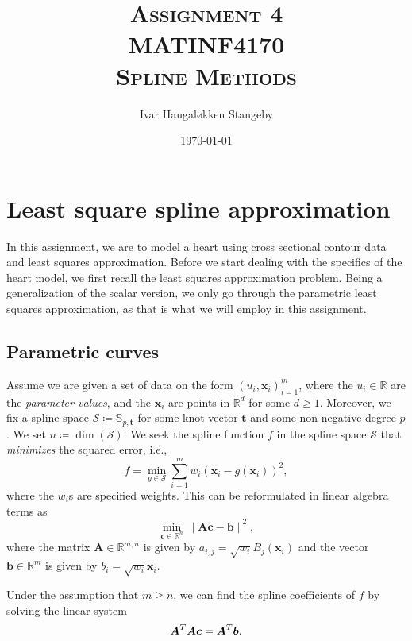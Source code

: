 \documentclass[article]{memoir}
\title{\textsc{Assignment 4 \\ 
               MATINF4170 \\
       Spline Methods}}
\author{Ivar Haugal{\o}kken Stangeby}
\date{\today}
\newcommand{\x}{\mathbf{x}}
\newcommand{\R}{\mathbb{R}}
\renewcommand{\t}{\mathbf{t}}
\renewcommand{\c}{\boldsymbol{c}}
\newcommand{\A}{\boldsymbol{A}}
\renewcommand{\b}{\boldsymbol{b}}
\renewcommand{\S}{\mathcal{S}}
\begin{document}
\maketitle

\tableofcontents*

\chapter{Least square spline approximation}

In this assignment, we are to model a heart using cross sectional contour data
and least squares approximation. Before we start dealing with the specifics of
the heart model, we first recall the least squares approximation problem.
Being a generalization of the scalar version, we only go through the parametric
least squares approximation, as that is what we will employ in this assignment.

\section{Parametric curves}
\label{sec:para_curves}
Assume we are given a set of data on the form \((u_i, \x_i)_{i = 1}^{m}\),
where the \( u_i \in \R \) are the \emph{parameter values}, and the \( \x_i \)
are points in \( \R^d \) for some \( d \geq 1 \). Moreover, we fix a spline
space \(\S \coloneqq \mathbb{S}_{p, \t}\) for some knot vector \(\t\) and some
non-negative degree \( p \).  We set \( n \coloneqq \dim(\S)\).  We seek the
spline function \( f \) in the spline space \(\S\) that \emph{minimizes} the
squared error, i.e., 
\begin{equation} 
    \label{eq:least_squares_problem}
    f = \min_{g \in \S} \sum^{m}_{i=1} w_i (\x_i - g(\x_i))^2,
\end{equation}
where the \(w_i\)s are specified weights. This can be reformulated in linear
algebra terms as
\begin{equation}
    \label{eq:least_quares_linalg}
    \min_{\c \in \R^n} \| \A\c - \b \|^2, 
\end{equation}
where the matrix \( \A \in \R^{m, n} \) is given by \( a_{i, j} =
\sqrt{w_i}B_j(\x_i) \) and the vector \( \b \in \R^m \) is given by \( b_i =
\sqrt{w_i}\x_i \).

Under the assumption that \( m \geq n \), we can find the spline coefficients
of \( f \) by solving the linear system
\begin{equation}
    \notag
    \A^T\A\c = \A^T\b.
\end{equation}
\end{document}
